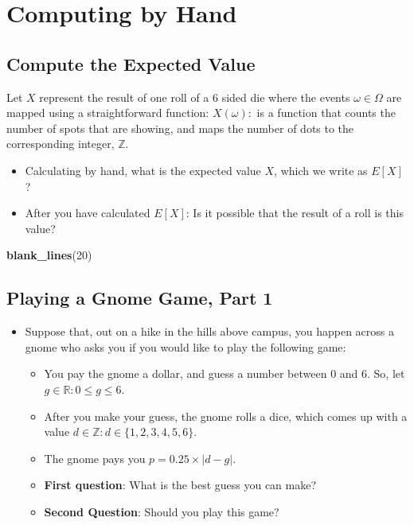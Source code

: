 \documentclass[
]{book}
\newenvironment{Shaded}{\begin{snugshade}}{\end{snugshade}}
\newcommand{\DecValTok}[1]{\textcolor[rgb]{0.00,0.00,0.81}{#1}}
\newcommand{\FunctionTok}[1]{\textcolor[rgb]{0.13,0.29,0.53}{\textbf{#1}}}
\newcommand{\NormalTok}[1]{#1}
\providecommand{\tightlist}{%
  \setlength{\itemsep}{0pt}\setlength{\parskip}{0pt}}
\theoremstyle{definition}
\theoremstyle{definition}
\theoremstyle{definition}
\theoremstyle{definition}
\theoremstyle{remark}
\begin{document}
\section{Computing by Hand}\label{computing-by-hand}

\subsection{Compute the Expected Value}\label{compute-the-expected-value}

Let \(X\) represent the result of one roll of a 6 sided die where the events \(\omega \in \Omega\) are mapped using a straightforward function: \(X(\omega):\) is a function that counts the number of spots that are showing, and maps the number of dots to the corresponding integer, \(\mathbb{Z}\).

\begin{itemize}
\tightlist
\item
  Calculating by hand, what is the expected value \(X\), which we write as \(E[X]\)?
\item
  After you have calculated \(E[X]\): Is it possible that the result of a roll is this value?
\end{itemize}

\begin{Shaded}
\begin{Highlighting}[]
\FunctionTok{blank\_lines}\NormalTok{(}\DecValTok{20}\NormalTok{)}
\end{Highlighting}
\end{Shaded}

\vspace{20cm}

\subsection{Playing a Gnome Game, Part 1}\label{playing-a-gnome-game-part-1}

\begin{itemize}
\tightlist
\item
  Suppose that, out on a hike in the hills above campus, you happen across a gnome who asks you if you would like to play the following game:

  \begin{itemize}
  \tightlist
  \item
    You pay the gnome a dollar, and guess a number between 0 and 6. So, let \(g \in \mathbb{R}: 0 \leq g \leq 6\).
  \item
    After you make your guess, the gnome rolls a dice, which comes up with a value \(d \in \mathbb{Z}: d \in \{1,2,3,4,5,6\}\).
  \item
    The gnome pays you \(p = 0.25 \times |d - g|\).
  \item
    \textbf{First question}: What is the best guess you can make?
  \item
    \textbf{Second Question}: Should you play this game?
  \end{itemize}
\end{itemize}
\end{document}
